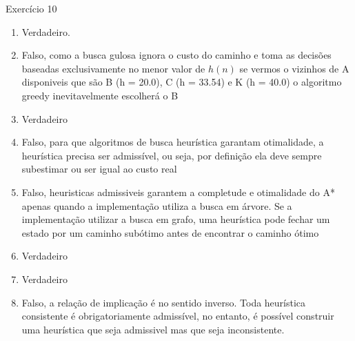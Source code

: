 \documentclass[a4paper,11pt]{article}
\theoremstyle{definition}
\theoremstyle{plain}
\theoremstyle{remark}
\newcounter{questao}[section]
\begin{document}
\begin{questaoManually}{Exercício 10}
  \begin{enumerate}
    \item Verdadeiro.
    \item Falso, como a busca gulosa ignora o custo do caminho e toma as decisões baseadas exclusivamente no menor valor de $h(n)$ se vermos o vizinhos de A disponiveis que são B (h = 20.0), C (h = 33.54) e K (h = 40.0) o algoritmo greedy inevitavelmente escolherá o B
    \item Verdadeiro
    \item Falso, para que algoritmos de busca heurística garantam otimalidade, a heurística precisa ser admissível, ou seja, por definição ela deve sempre subestimar ou ser igual ao custo real
    \item Falso, heuristicas admissiveis garantem a completude e otimalidade do A* apenas quando a implementação utiliza a busca em árvore. Se a implementação utilizar a busca em grafo, uma heurística pode fechar um estado por um caminho subótimo antes de encontrar o caminho ótimo
    \item Verdadeiro
    \item Verdadeiro
    \item Falso, a relação de implicação é no sentido inverso. Toda heurística consistente é obrigatoriamente admissível, no entanto, é possível construir uma heurística que seja admissivel mas que seja inconsistente.
  \end{enumerate}
\end{questaoManually}
\end{document}

